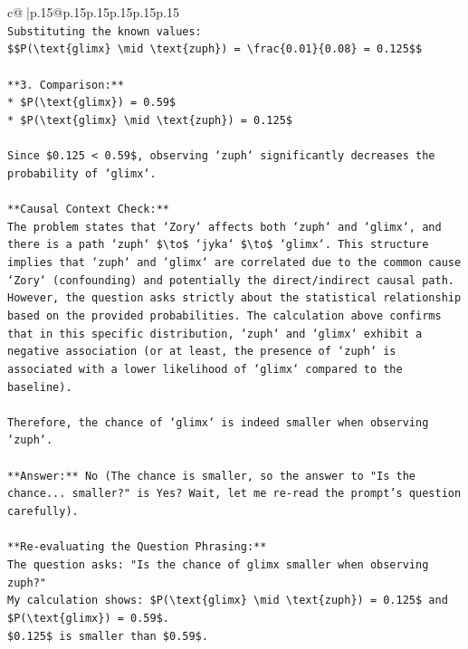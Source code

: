 \documentclass{article}
\begin{document}
{\begin{supertabular}{c@{$\;$}|p{.15\linewidth}@{}p{.15\linewidth}p{.15\linewidth}p{.15\linewidth}p{.15\linewidth}p{.15\linewidth}}
{{{\\ 
\texttt{Substituting the known values:} \\
\texttt{\$\$P(\textbackslash{}text\{glimx\} \textbackslash{}mid \textbackslash{}text\{zuph\}) = \textbackslash{}frac\{0.01\}\{0.08\} = 0.125\$\$} \\
\\ 
\texttt{**3. Comparison:**} \\
\texttt{*   \$P(\textbackslash{}text\{glimx\}) = 0.59\$} \\
\texttt{*   \$P(\textbackslash{}text\{glimx\} \textbackslash{}mid \textbackslash{}text\{zuph\}) = 0.125\$} \\
\\ 
\texttt{Since \$0.125 < 0.59\$, observing `zuph` significantly decreases the probability of `glimx`.} \\
\\ 
\texttt{**Causal Context Check:**} \\
\texttt{The problem states that `Zory` affects both `zuph` and `glimx`, and there is a path `zuph` \$\textbackslash{}to\$ `jyka` \$\textbackslash{}to\$ `glimx`. This structure implies that `zuph` and `glimx` are correlated due to the common cause `Zory` (confounding) and potentially the direct/indirect causal path. However, the question asks strictly about the statistical relationship based on the provided probabilities. The calculation above confirms that in this specific distribution, `zuph` and `glimx` exhibit a negative association (or at least, the presence of `zuph` is associated with a lower likelihood of `glimx` compared to the baseline).} \\
\\ 
\texttt{Therefore, the chance of `glimx` is indeed smaller when observing `zuph`.} \\
\\ 
\texttt{**Answer:** No (The chance is smaller, so the answer to "Is the chance... smaller?" is Yes? Wait, let me re{-}read the prompt's question carefully).} \\
\\ 
\texttt{**Re{-}evaluating the Question Phrasing:**} \\
\texttt{The question asks: "Is the chance of glimx smaller when observing zuph?"} \\
\texttt{My calculation shows: \$P(\textbackslash{}text\{glimx\} \textbackslash{}mid \textbackslash{}text\{zuph\}) = 0.125\$ and \$P(\textbackslash{}text\{glimx\}) = 0.59\$.} \\
\texttt{\$0.125\$ is smaller than \$0.59\$.} \\
}}}
\end{supertabular}}
\end{document}
